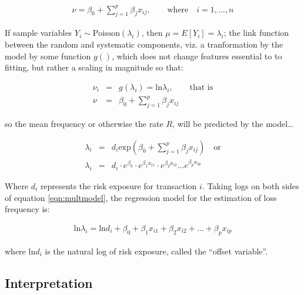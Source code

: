 \documentclass[]{DissertateUSU}
\begin{document}
\singlespacing

\begin{eqnarray}
\nu = \beta_0 + \sum_{j=1}^{p}\beta_jx_{ij}, \qquad \mbox{where} \quad i = 1,\ldots,n
\end{eqnarray}

\doublespacing

If sample variables \(Y_i \sim \mbox{Poisson}(\lambda_i)\), then
\(\mu = E[Y_i] = \lambda_i\); the link function between the random and
systematic components, viz. a tranformation by the model by some
function \(g()\), which does not change features essential to to
fitting, but rather a scaling in magnitude so that:

\singlespacing

\begin{eqnarray}\label{eqn:linkfcn }
\nu_i &=& g(\lambda_i) = \mbox{ln}\lambda_i, \qquad \mbox{that is} \nonumber \\
\nu &=& \beta_0 + \sum_{j=1}^{p}\beta_jx_{ij}
\end{eqnarray}

\doublespacing

so the mean frequency or otherwise the rate \(R\), will be predicted by
the model\ldots

\singlespacing

\begin{eqnarray}\label{eqn:multmodel}
\lambda_i &=& d_i\mbox{exp}(\beta_0 + \sum_{j=1}^{p}\beta_jx_{ij}) \quad \mbox{or} \nonumber \\
\lambda_i &=& d_i\cdot e^{\beta_0}\cdot e^{\beta_1x_{i1}}\cdot e^{\beta_2x_{i2}} \ldots e^{\beta_px_{ip}}
\end{eqnarray}

\doublespacing

Where \(d_i\) represents the risk exposure for transaction \(i\). Taking
logs on both sides of equation \ref{eqn:multmodel}, the regression model
for the estimation of loss frequency is:

\singlespacing

\begin{eqnarray}
\mbox{ln}\lambda_i =  \mbox{ln}d_i + \beta_0 + \beta_1x_{i1} + \beta_2x_{i2} + \ldots + \beta_px_{ip}
\end{eqnarray}

\doublespacing

where \(\mbox{ln}d_i\) is the natural log of risk exposure, called the
``offset variable''.

\subsection{Interpretation}
\end{document}
